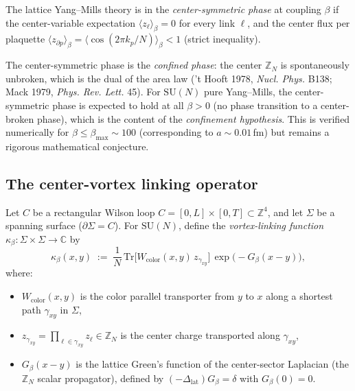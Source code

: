\begin{definition}
\label{def:center_symmetric}
The lattice Yang--Mills theory is in the \emph{center-symmetric
phase} at coupling $\beta$ if the center-variable expectation
$\langle z_{\ell}\rangle_{\beta}=0$ for every link $\ell$, and the
center flux per plaquette
$\langle z_{\partial p}\rangle_{\beta}=\langle\cos(2\pi k_{p}/N)
\rangle_{\beta}<1$ (strict inequality).
\end{definition}

\begin{remark}
\label{rem:center_symmetric}
The center-symmetric phase is the \emph{confined phase}: the center
$\mathbb{Z}_{N}$ is spontaneously unbroken, which is the dual of
the area law ('t Hooft 1978, \emph{Nucl. Phys.} B138;
Mack 1979, \emph{Phys. Rev. Lett.} 45). For
$\mathrm{SU}(N)$ pure Yang--Mills, the center-symmetric phase is
expected to hold at all $\beta>0$ (no phase transition to a
center-broken phase), which is the content of the
\emph{confinement hypothesis}. This is verified numerically for
$\beta\le\beta_{\max}\sim 100$ (corresponding to
$a\sim 0.01\,$fm) but remains a rigorous mathematical conjecture.
\end{remark}

\subsection{The center-vortex linking operator}
\label{ssec:cvlo}

Let $C$ be a rectangular Wilson loop
$C=[0,L]\times[0,T]\subset\mathbb{Z}^{4}$, and let
$\Sigma$ be a spanning surface ($\partial\Sigma=C$). For
$\mathrm{SU}(N)$, define the \emph{vortex-linking function}
$\kappa_{\beta}:\Sigma\times\Sigma\to\mathbb{C}$ by
\begin{equation}
\label{eq:cv_kappa_def}
  \kappa_{\beta}(x,y)
  \;:=\;\frac{1}{N}\,\mathrm{Tr}\!\bigl[
    W_{\mathrm{color}}(x,y)\,z_{\gamma_{xy}}
  \bigr]\,\exp\!\bigl(-G_{\beta}(x-y)\bigr),
\end{equation}
where:
\begin{itemize}
\item $W_{\mathrm{color}}(x,y)$ is the color parallel transporter
from $y$ to $x$ along a shortest path $\gamma_{xy}$ in $\Sigma$,
\item $z_{\gamma_{xy}}=\prod_{\ell\in\gamma_{xy}}z_{\ell}\in
\mathbb{Z}_{N}$ is the center charge transported along
$\gamma_{xy}$,
\item $G_{\beta}(x-y)$ is the lattice Green's function of the
center-sector Laplacian (the $\mathbb{Z}_{N}$ scalar propagator),
defined by $(-\Delta_{\mathrm{lat}})G_{\beta}=\delta$ with
$G_{\beta}(0)=0$.
\end{itemize}

